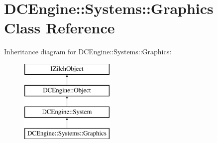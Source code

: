\hypertarget{classDCEngine_1_1Systems_1_1Graphics}{\section{D\-C\-Engine\-:\-:Systems\-:\-:Graphics Class Reference}
\label{classDCEngine_1_1Systems_1_1Graphics}
}
Inheritance diagram for D\-C\-Engine\-:\-:Systems\-:\-:Graphics\-:\begin{figure}[H]
\begin{center}
\leavevmode
\includegraphics[height=4.000000cm]{classDCEngine_1_1Systems_1_1Graphics}
\end{center}
\end{figure}
